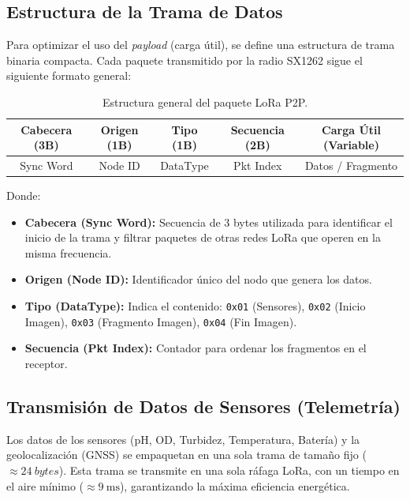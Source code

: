 \subsection{Estructura de la Trama de Datos}
\label{subsec:estructura_trama}

Para optimizar el uso del \textit{payload} (carga útil), se define una estructura de trama binaria compacta. Cada paquete transmitido por la radio SX1262 sigue el siguiente formato general:

\begin{table}[h!]
  \centering
  \caption{Estructura general del paquete LoRa P2P.}
  \label{tab:trama_lora}
  \renewcommand{\arraystretch}{1.2}
  \begin{tabular}{|c|c|c|c|c|}
    \hline
    \textbf{Cabecera (3B)} & \textbf{Origen (1B)} & \textbf{Tipo (1B)} & \textbf{Secuencia (2B)} & \textbf{Carga Útil (Variable)} \\
    \hline
    Sync Word & Node ID & DataType & Pkt Index & Datos / Fragmento \\
    \hline
  \end{tabular}
\end{table}

Donde:
\begin{itemize}
  \item \textbf{Cabecera (Sync Word):} Secuencia de 3 bytes utilizada para identificar el inicio de la trama y filtrar paquetes de otras redes LoRa que operen en la misma frecuencia.
  \item \textbf{Origen (Node ID):} Identificador único del nodo que genera los datos.
  \item \textbf{Tipo (DataType):} Indica el contenido: \texttt{0x01} (Sensores), \texttt{0x02} (Inicio Imagen), \texttt{0x03} (Fragmento Imagen), \texttt{0x04} (Fin Imagen).
  \item \textbf{Secuencia (Pkt Index):} Contador para ordenar los fragmentos en el receptor.
\end{itemize}


\subsection{Transmisión de Datos de Sensores (Telemetría)}
\label{subsec:transmision_de_datos_de_sensores_telemetria}
Los datos de los sensores (pH, OD, Turbidez, Temperatura, Batería) y la geolocalización (GNSS) se empaquetan en una sola trama de tamaño fijo ($\approx \SI{24}{bytes}$). Esta trama se transmite en una sola ráfaga LoRa, con un tiempo en el aire mínimo ($\approx \SI{9}{\milli\second}$), garantizando la máxima eficiencia energética.


